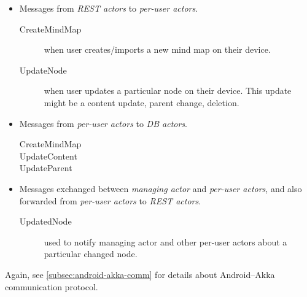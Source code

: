 \begin{itemize}
	\item Messages from \emph{REST actors} to \emph{per-user actors}.
	\begin{description}
		\item[CreateMindMap]{when user creates/imports a new mind map on their device.}
		\item[UpdateNode]{when user updates a particular node on their device. This update might be a content update, parent change, deletion.}
	\end{description}

	\item Messages from \emph{per-user actors} to \emph{DB actors}.
	\begin{description}
		\item[CreateMindMap]{}
		\item[UpdateContent]{}
		\item[UpdateParent]{}
	\end{description}

	\item Messages exchanged between \emph{managing actor} and \emph{per-user actors}, and also forwarded from \emph{per-user actors} to \emph{REST actors}.
	\begin{description}
		\item[UpdatedNode]{used to notify managing actor and other per-user actors about a particular changed node.}
	\end{description}
\end{itemize}


Again, see \cref{subsec:android-akka-comm} for details about Android--Akka communication protocol.